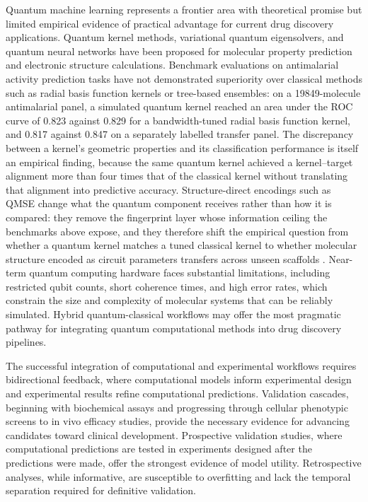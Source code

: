 Quantum machine learning represents a frontier area with theoretical promise but limited empirical evidence of practical advantage for current drug discovery applications. Quantum kernel methods, variational quantum eigensolvers, and quantum neural networks have been proposed for molecular property prediction and electronic structure calculations. Benchmark evaluations on antimalarial activity prediction tasks have not demonstrated superiority over classical methods such as radial basis function kernels or tree-based ensembles: on a \num{19849}-molecule antimalarial panel, a simulated quantum kernel reached an area under the ROC curve of \num{0.823} against \num{0.829} for a bandwidth-tuned radial basis function kernel, and \num{0.817} against \num{0.847} on a separately labelled transfer panel. The discrepancy between a kernel's geometric properties and its classification performance is itself an empirical finding, because the same quantum kernel achieved a kernel--target alignment more than four times that of the classical kernel without translating that alignment into predictive accuracy. Structure-direct encodings such as QMSE change what the quantum component receives rather than how it is compared: they remove the fingerprint layer whose information ceiling the benchmarks above expose, and they therefore shift the empirical question from whether a quantum kernel matches a tuned classical kernel to whether molecular structure encoded as circuit parameters transfers across unseen scaffolds \cite{Boy2025QMSE}. Near-term quantum computing hardware faces substantial limitations, including restricted qubit counts, short coherence times, and high error rates, which constrain the size and complexity of molecular systems that can be reliably simulated. Hybrid quantum-classical workflows may offer the most pragmatic pathway for integrating quantum computational methods into drug discovery pipelines.

The successful integration of computational and experimental workflows requires bidirectional feedback, where computational models inform experimental design and experimental results refine computational predictions. Validation cascades, beginning with biochemical assays and progressing through cellular phenotypic screens to in vivo efficacy studies, provide the necessary evidence for advancing candidates toward clinical development. Prospective validation studies, where computational predictions are tested in experiments designed after the predictions were made, offer the strongest evidence of model utility. Retrospective analyses, while informative, are susceptible to overfitting and lack the temporal separation required for definitive validation.

